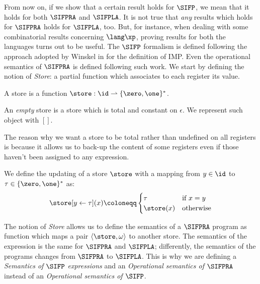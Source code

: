 From now on, if we show that a certain result holds for $\SIFP$, we mean that it
holds for both $\SIFPRA$ and $\SIFPLA$. It is not true that \emph{any}
results which holds for $\SIFPRA$ holds for $\SIFPLA$, too. But, for instance,
when dealing with some combinatorial results concerning $\lang\xp$,
proving results for both the languages turns out to be useful.
%
The $\SIFP$ formalism is defined following the approach
adopted by Winskel in \cite{winskel1993formal} for the definition of IMP.
%
Even the operational semantics of $\SIFPRA$ is defined following such work.
We start by defining the notion of \emph{Store}: a partial function which
associates to each register its value.

\begin{defn}[Store]
A store is a function $\store: \id \rightharpoonup \{\zero, \one\}^*$.
\end{defn}

\begin{defn}
An \emph{empty} store is a store which is total and constant on $\epsilon$. We represent such object with $[]$.
\end{defn}

The reason why we want a store to be total rather than undefined on all registers
is because it allows us to back-up the content of some registers even if
those haven't been assigned to any expression.

\begin{defn}
We define the updating of a store $\store$ with a mapping from $y \in \id$ to $\tau \in \{\zero, \one\}^*$ as:
\[
\store[y\leftarrow \tau](x) \coloneqq \begin{cases} \tau & \text{if } x = y\\ \store(x) & \text{otherwise}\end{cases}
\]

\end{defn}

The notion of \emph{Store} allows us to define the semantics of
a $\SIFPRA$ program as function which maps a pair $\langle \store,\omega\rangle$
to another store.
%
The semantics of the expression is the same for $\SIFPRA$ and $\SIFPLA$;
differently, the semantics of the programs changes from $\SIFPRA$ to $\SIFPLA$.
This is why we are defining a \emph{Semantics of $\SIFP$ expressions} and an
\emph{Operational semantics of $\SIFPRA$} instead of an
\emph{Operational semantics of $\SIFP$}.

